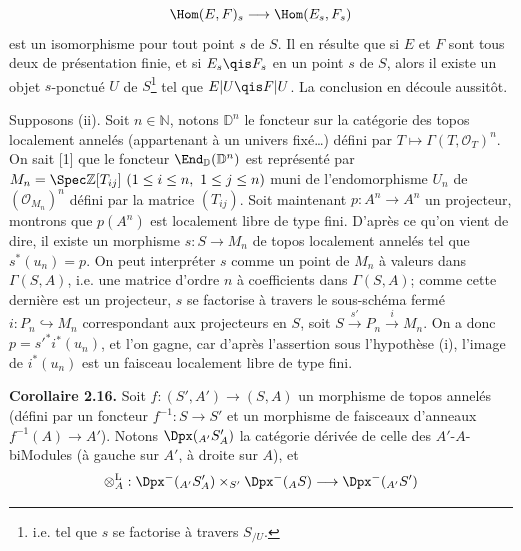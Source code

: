 \[
  \Hom(E,F)_s\longrightarrow\Hom(E_s,F_s)
\]
est un
isomorphisme pour tout point \(s\) de \(S\). Il en résulte que si \(E\) et \(F\) sont tous deux de présentation finie, et si \(E_s\qis F_s\) en un point \(s\) de \(S\), alors il existe un objet \(s\)-ponctué \(U\) de \(S\)\footnote{i.e. tel que \(s\) se factorise à travers \(S_{/U}\).} tel que \(E|U\qis F|U\). La conclusion en découle aussitôt.

Supposons (ii). Soit \(n\in\mathbb N\), notons \(\mathbb D^n\) le foncteur sur la catégorie des topos localement annelés (appartenant à un univers fixé\dots) défini par \(T\longmapsto\Gamma(T,\mathcal O_T)^n\). On sait [1] que le foncteur \(\End_{\mathbb D}(\mathbb D^n)\) est représenté par \(M_n=\Spec\mathbb Z[T_{ij}]\ (1\leq i\leq n,\ 1\leq j\leq n)\) muni de l'endomorphisme \(U_n\) de \((\mathcal O_{M_n})^n\) défini par la matrice \((T_{ij})\). Soit maintenant \(p:A^n\longrightarrow A^n\) un projecteur, montrons que \(p(A^n)\) est localement libre de type fini. D'après ce qu'on vient de dire, il existe un morphisme \(s:S\longrightarrow M_n\) de topos localement annelés tel que \(s^*(u_n)=p\). On peut interpréter \(s\) comme un point de \(M_n\) à valeurs dans \(\Gamma(S,A)\), i.e. une matrice d'ordre \(n\) à coefficients dans \(\Gamma(S,A)\); comme cette dernière est un projecteur, \(s\) se factorise à travers le sous-schéma fermé \(i:P_n\hookrightarrow M_n\) correspondant aux projecteurs en \(S\), soit \(S\xrightarrow{s'}P_n\xrightarrow{i}M_n\). On a donc \(p=s'^*i^*(u_n)\), et l'on gagne, car d'après l'assertion sous l'hypothèse (i), l'image de \(i^*(u_n)\) est un faisceau localement libre de type fini.

\textbf{Corollaire 2.16.} Soit \(f:(S',A')\to(S,A)\) un morphisme de topos annelés (défini par un foncteur \(f^{-1}:S\to S'\) et un morphisme de faisceaux d'anneaux \(f^{-1}(A)\to A'\)). Notons \(\Dpx({}_{A'}S'_A)\) la catégorie dérivée de celle des \(A'\)-\(A\)-biModules (à gauche sur \(A'\), à droite sur \(A\)), et
\[
  \otimes_A^{\mathrm L}:\Dpx^-(_{A'}S'_A)\times_{S'}\Dpx^-(_A S)
  \longrightarrow \Dpx^-(_{A'}S')
\]
